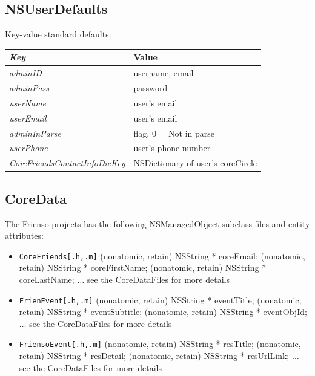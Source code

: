 \subsection{NSUserDefaults}
Key-value standard defaults:
	\begin{table}[ht!]%
	\begin{tabularx}{\linewidth}{ l X }
	\emph{Key} & Value \\\hline
	\emph{adminID} & username, email \\
	\emph{adminPass} & password \\
	\emph{userName} & user's email \\
	\emph{userEmail} & user's email \\
	\emph{adminInParse} & flag, 0 = Not in parse\\
	\emph{userPhone} & user's phone number \\
	\emph{CoreFriendsContactInfoDicKey} & NSDictionary of user's coreCircle\\
	\end{tabularx}
	\end{table}%
\subsection{CoreData}
The Frienso projects has the following NSManagedObject subclass files and entity 
attributes:
\begin{itemize}
\item \texttt{CoreFriends[.h,.m]}
	\subitem \small{\@property (nonatomic, retain) NSString * coreEmail;}
	\subitem \small{\@property (nonatomic, retain) NSString * coreFirstName;}
	\subitem \small{\@property (nonatomic, retain) NSString * coreLastName;}
	\subitem \small{$\ldots$ see the CoreDataFiles for more details}
\item \texttt{FrienEvent[.h,.m]}
	\subitem \small{\@property (nonatomic, retain) NSString * eventTitle;}
	\subitem \small{\@property (nonatomic, retain) NSString * eventSubtitle;}
	\subitem \small{\@property (nonatomic, retain) NSString * eventObjId;}
	\subitem \small{$\ldots$ see the CoreDataFiles for more details}
\item \texttt{FriensoEvent[.h,.m]}
	\subitem \small{\@property (nonatomic, retain) NSString * resTitle;}
	\subitem \small{\@property (nonatomic, retain) NSString * resDetail;}
	\subitem \small{\@property (nonatomic, retain) NSString * resUrlLink;}
	\subitem \small{$\ldots$ see the CoreDataFiles for more details}\normalsize
\end{itemize}

